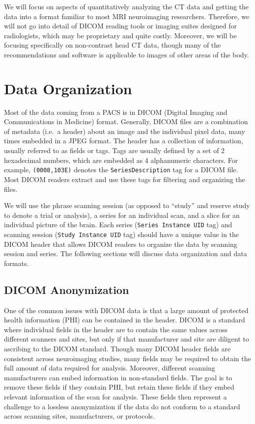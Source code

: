 \documentclass[]{elsarticle} %
\begin{document}
We will focus on aspects of quantitatively analyzing the CT data and
getting the data into a format familiar to most MRI neuroimaging
researchers. Therefore, we will not go into detail of DICOM reading
tools or imaging suites designed for radiologists, which may be
proprietary and quite costly. Moreover, we will be focusing specifically
on non-contrast head CT data, though many of the recommendations and
software is applicable to images of other areas of the body.

\hypertarget{data-organization}{%
\section{Data Organization}\label{data-organization}}

Most of the data coming from a PACS is in DICOM (Digital Imaging and
Communications in Medicine) format. Generally, DICOM files are a
combination of metadata (i.e.~a header) about an image and the
individual pixel data, many times embedded in a JPEG format. The header
has a collection of information, usually referred to as fields or tags.
Tags are usually defined by a set of 2 hexadecimal numbers, which are
embedded as 4 alphanumeric characters. For example, \texttt{(0008,103E)}
denotes the \texttt{SeriesDescription} tag for a DICOM file. Most DICOM
readers extract and use these tags for filtering and organizing the
files.

We will use the phrase scanning session (as opposed to ``study'' and
reserve study to denote a trial or analysis), a series for an individual
scan, and a slice for an individual picture of the brain. Each series
(\texttt{Series\ Instance\ UID} tag) and scanning session
(\texttt{Study\ Instance\ UID} tag) should have a unique value in the
DICOM header that allows DICOM readers to organize the data by scanning
session and series. The following sections will discuss data
organization and data formats.

\hypertarget{dicom-anonymization}{%
\subsection{DICOM Anonymization}\label{dicom-anonymization}}

One of the common issues with DICOM data is that a large amount of
protected health information (PHI) can be contained in the header. DICOM
is a standard where individual fields in the header are to contain the
same values across different scanners and sites, but only if that
manufacturer and site are diligent to ascribing to the DICOM standard.
Though many DICOM header fields are consistent across neuroimaging
studies, many fields may be required to obtain the full amount of data
required for analysis. Moreover, different scanning manufacturers can
embed information in non-standard fields. The goal is to remove these
fields if they contain PHI, but retain these fields if they embed
relevant information of the scan for analysis. These fields then
represent a challenge to a lossless anonymization if the data do not
conform to a standard across scanning sites, manufacturers, or
protocols.
\end{document}
